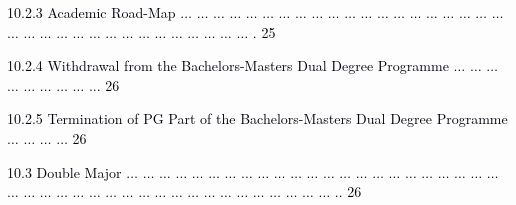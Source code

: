 \documentclass[12pt]{article}
\begin{document}
\vspace{\baselineskip}
\begin{adjustwidth}{0.5in}{0.0in}
{\fontsize{7pt}{8.4pt}\selectfont \textcolor[HTML]{00000A}{10.2.3 Academic Road-Map $ \ldots $ $ \ldots $ $ \ldots $ $ \ldots $ $ \ldots $ $ \ldots $ $ \ldots $ $ \ldots $ $ \ldots $ $ \ldots $ $ \ldots $ $ \ldots $ $ \ldots $ $ \ldots $ $ \ldots $ $ \ldots $ $ \ldots $ $ \ldots $ $ \ldots $ $ \ldots $ $ \ldots $ $ \ldots $ $ \ldots $ $ \ldots $ $ \ldots $ $ \ldots $ $ \ldots $ $ \ldots $ $ \ldots $ $ \ldots $ $ \ldots $ $ \ldots $ $ \ldots $ $ \ldots $ $ \ldots $ . 25}\par}\par

\end{adjustwidth}


\vspace{\baselineskip}
\begin{adjustwidth}{0.5in}{0.0in}
{\fontsize{8pt}{9.6pt}\selectfont \textcolor[HTML]{00000A}{10.2.4 Withdrawal from the Bachelors-Masters Dual Degree Programme $ \ldots $ $ \ldots $ $ \ldots $ $ \ldots $ $ \ldots $ $ \ldots $ $ \ldots $ $ \ldots $ ... 26}\par}\par

\end{adjustwidth}


\vspace{\baselineskip}
\begin{adjustwidth}{0.5in}{0.0in}
{\fontsize{8pt}{9.6pt}\selectfont \textcolor[HTML]{00000A}{10.2.5 Termination of PG Part of the Bachelors-Masters Dual Degree Programme $ \ldots $ $ \ldots $ $ \ldots $ $ \ldots $  26}\par}\par

\end{adjustwidth}


\vspace{\baselineskip}
\begin{adjustwidth}{0.21in}{0.0in}
{\fontsize{7pt}{8.4pt}\selectfont \textcolor[HTML]{00000A}{10.3 Double Major $ \ldots $ $ \ldots $ $ \ldots $ $ \ldots $ $ \ldots $ $ \ldots $ $ \ldots $ $ \ldots $ $ \ldots $ $ \ldots $ $ \ldots $ $ \ldots $ $ \ldots $ $ \ldots $ $ \ldots $ $ \ldots $ $ \ldots $ $ \ldots $ $ \ldots $ $ \ldots $ $ \ldots $ $ \ldots $ $ \ldots $ $ \ldots $ $ \ldots $ $ \ldots $ $ \ldots $ $ \ldots $ $ \ldots $ $ \ldots $ $ \ldots $ $ \ldots $ $ \ldots $ $ \ldots $ $ \ldots $ $ \ldots $ $ \ldots $ $ \ldots $ $ \ldots $ $ \ldots $ $ \ldots $ $ \ldots $ $ \ldots $ .. 26}\par}\par

\end{adjustwidth}
\end{document}
